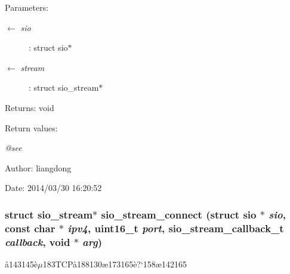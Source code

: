 \begin{Desc}
\item[Parameters:]
\begin{description}
\item[\mbox{$\leftarrow$} {\em sio}]: struct sio$\ast$ \item[\mbox{$\leftarrow$} {\em stream}]: struct sio\_\-stream$\ast$ \end{description}
\end{Desc}
\begin{Desc}
\item[Returns:]void \end{Desc}
\begin{Desc}
\item[Return values:]
\begin{description}
\item[{\em @see}]\end{description}
\end{Desc}
\begin{Desc}
\item[Author:]liangdong \end{Desc}
\begin{Desc}
\item[Date:]2014/03/30 16:20:52 \end{Desc}
\subsubsection{\setlength{\rightskip}{0pt plus 5cm}struct sio\_\-stream$\ast$ sio\_\-stream\_\-connect (struct sio $\ast$ {\em sio}, const char $\ast$ {\em ipv4}, uint16\_\-t {\em port}, sio\_\-stream\_\-callback\_\-t {\em callback}, void $\ast$ {\em arg})}\label{sio__stream_8h_a9}


\aa{}143145\`{e}$\mu$183TCP\aa{}188130\ae{}173165\`{e}?`158\ae{}142165 

